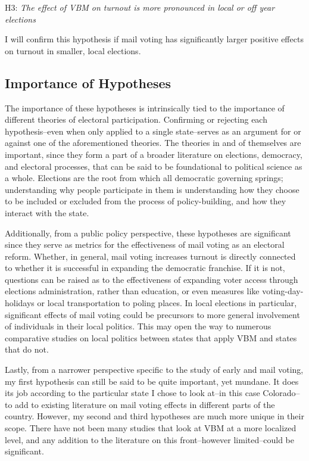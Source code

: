 \documentclass[12pt,twoside]{reedthesis}
\begin{document}
  \begin{center}    
  H3: \textit{The  effect  of  VBM  on  turnout  is  more  pronounced  in  local  or  off year elections}
  \end{center}
  
  I will confirm this hypothesis if mail voting has significantly larger
  positive effects on turnout in smaller, local elections.
  
  \subsection{Importance of Hypotheses}\label{importance-of-hypotheses}
  
  The importance of these hypotheses is intrinsically tied to the
  importance of different theories of electoral participation. Confirming
  or rejecting each hypothesis--even when only applied to a single
  state--serves as an argument for or against one of the aforementioned
  theories. The theories in and of themselves are important, since they
  form a part of a broader literature on elections, democracy, and
  electoral processes, that can be said to be foundational to political
  science as a whole. Elections are the root from which all democratic
  governing springs; understanding why people participate in them is
  understanding how they choose to be included or excluded from the
  process of policy-building, and how they interact with the state.
  
  Additionally, from a public policy perspective, these hypotheses are
  significant since they serve as metrics for the effectiveness of mail
  voting as an electoral reform. Whether, in general, mail voting
  increases turnout is directly connected to whether it is successful in
  expanding the democratic franchise. If it is not, questions can be
  raised as to the effectiveness of expanding voter access through
  elections administration, rather than education, or even measures like
  voting-day-holidays or local transportation to poling places. In local
  elections in particular, significant effects of mail voting could be
  precursors to more general involvement of individuals in their local
  politics. This may open the way to numerous comparative studies on local
  politics between states that apply VBM and states that do not.
  
  Lastly, from a narrower perspective specific to the study of early and
  mail voting, my first hypothesis can still be said to be quite
  important, yet mundane. It does its job according to the particular
  state I chose to look at--in this case Colorado--to add to existing
  literature on mail voting effects in different parts of the country.
  However, my second and third hypotheses are much more unique in their
  scope. There have not been many studies that look at VBM at a more
  localized level, and any addition to the literature on this
  front--however limited--could be significant.
  
\end{document}
